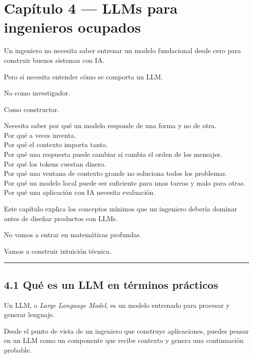 \newpage

\chapter{Capítulo 4 --- LLMs para ingenieros
ocupados}\label{capuxedtulo-4-llms-para-ingenieros-ocupados}

Un ingeniero no necesita saber entrenar un modelo fundacional desde cero
para construir buenos sistemas con IA.

Pero sí necesita entender cómo se comporta un LLM.

No como investigador.

Como constructor.

Necesita saber por qué un modelo responde de una forma y no de otra.\\
Por qué a veces inventa.\\
Por qué el contexto importa tanto.\\
Por qué una respuesta puede cambiar si cambia el orden de los
mensajes.\\
Por qué los tokens cuestan dinero.\\
Por qué una ventana de contexto grande no soluciona todos los
problemas.\\
Por qué un modelo local puede ser suficiente para unas tareas y malo
para otras.\\
Por qué una aplicación con IA necesita evaluación.

Este capítulo explica los conceptos mínimos que un ingeniero debería
dominar antes de diseñar productos con LLMs.

No vamos a entrar en matemáticas profundas.

Vamos a construir intuición técnica.

\begin{center}\rule{0.5\linewidth}{0.5pt}\end{center}

\section{4.1 Qué es un LLM en términos
prácticos}\label{quuxe9-es-un-llm-en-tuxe9rminos-pruxe1cticos}

Un LLM, o \emph{Large Language Model}, es un modelo entrenado para
procesar y generar lenguaje.

Desde el punto de vista de un ingeniero que construye aplicaciones,
puedes pensar en un LLM como un componente que recibe contexto y genera
una continuación probable.

